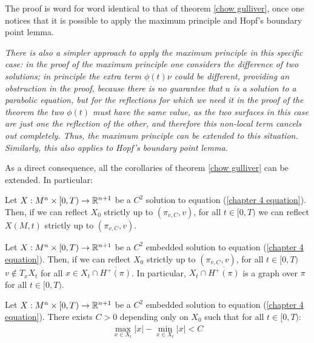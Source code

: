 The proof is word for word identical to that of theorem \ref{chow gulliver}, once one notices that it is possible to apply the maximum principle and Hopf's boundary point lemma. 

\begin{oss}\em
	There is also a simpler approach to apply the maximum principle in this specific case: in the proof of the maximum principle one considers the difference of two solutions; in principle the extra term $\phi(t) \nu$ could be different, providing an obstruction in the proof, because there is no guarantee that $u$ is a solution to a parabolic equation, but for the reflections for which we need it in the proof of the theorem the two $\phi(t)$ must have the same value, as the two surfaces in this case are just one the reflection of the other, and therefore this non-local term cancels out completely. Thus, the maximum principle can be extended to this situation. Similarly, this also applies to Hopf's boundary point lemma. 
\end{oss}

As a direct consequence, all the corollaries of theorem \ref{chow gulliver} can be extended. In particular:


\begin{cor}
	Let $X:M^n\times [0,T) \rightarrow \mathbb{R}^{n+1}$ be a $C^2$ solution to equation (\ref{chapter 4 equation}). Then, if we can reflect $X_0$ strictly up to $(\pi_{v,C},v)$, for all $t\in [0,T)$ we can reflect $X(M, t)$ strictly up to $(\pi_{v,C},v)$. 
\end{cor}

\begin{cor}
	Let $X:M^n\times [0,T) \rightarrow \mathbb{R}^{n+1}$ be a $C^2$ embedded solution to equation (\ref{chapter 4 equation}). Then, if we can reflect $X_0$ strictly up to $(\pi_{v,C},v)$, for all $t\in [0,T)$ $v\notin T_xX_t$ for all $x\in X_t\cap\overline{H^+(\pi)}$. In particular,  $ X_t\cap\overline{H^+(\pi)}$ is a graph over $\pi$ for all $t\in [0,T)$.
\end{cor}


\begin{cor}
	Let $X:M^n\times [0,T) \rightarrow \mathbb{R}^{n+1}$ be a $C^2$ embedded solution to equation (\ref{chapter 4 equation}). There exists $C>0$ depending only on $X_0$ such that for all $t\in[0, T)$: 
	\begin{align*}
		\max_{x\in X_t} |x| - \min_{x\in X_t} |x| < C
	\end{align*}\label{new sandwich estimate}
\end{cor}
 

